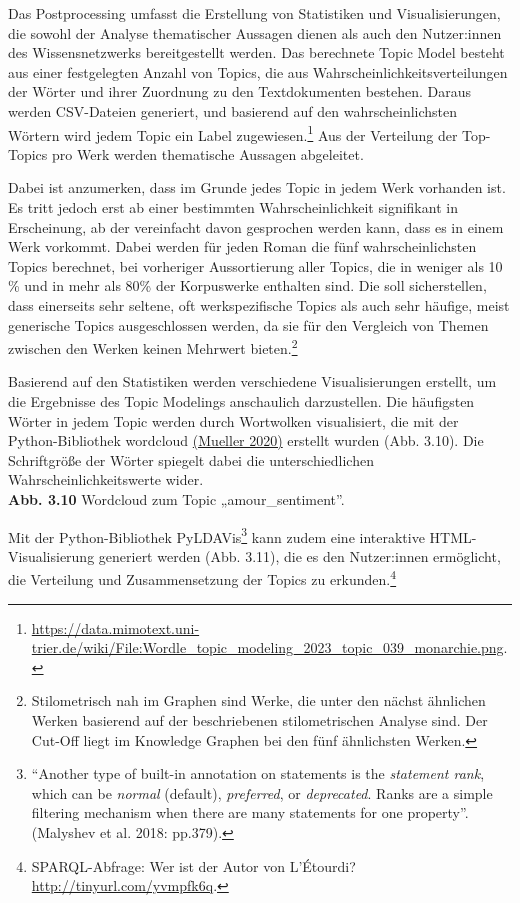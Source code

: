 \documentclass[
  12pt,
  letterpaper,
  DIV=11,
  numbers=noendperiod]{scrreprt}
\begin{document}
Das Postprocessing umfasst die Erstellung von Statistiken und
Visualisierungen, die sowohl der Analyse thematischer Aussagen dienen
als auch den Nutzer:innen des Wissensnetzwerks bereitgestellt werden.
Das berechnete Topic Model besteht aus einer festgelegten Anzahl von
Topics, die aus Wahrscheinlichkeitsverteilungen der Wörter und ihrer
Zuordnung zu den Textdokumenten bestehen. Daraus werden CSV-Dateien
generiert, und basierend auf den wahrscheinlichsten Wörtern wird jedem
Topic ein Label zugewiesen.\footnote{\url{https://data.mimotext.uni-trier.de/wiki/File:Wordle_topic_modeling_2023_topic_039_monarchie.png}.}
Aus der Verteilung der Top-Topics pro Werk werden thematische Aussagen
abgeleitet.

Dabei ist anzumerken, dass im Grunde jedes Topic in jedem Werk vorhanden
ist. Es tritt jedoch erst ab einer bestimmten Wahrscheinlichkeit
signifikant in Erscheinung, ab der vereinfacht davon gesprochen werden
kann, dass es in einem Werk vorkommt. Dabei werden für jeden Roman die
fünf wahrscheinlichsten Topics berechnet, bei vorheriger Aussortierung
aller Topics, die in weniger als 10 \% und in mehr als 80\% der
Korpuswerke enthalten sind. Die soll sicherstellen, dass einerseits sehr
seltene, oft werkspezifische Topics als auch sehr häufige, meist
generische Topics ausgeschlossen werden, da sie für den Vergleich von
Themen zwischen den Werken keinen Mehrwert bieten.\footnote{Stilometrisch
  nah im Graphen sind Werke, die unter den nächst ähnlichen Werken
  basierend auf der beschriebenen stilometrischen Analyse sind. Der
  Cut-Off liegt im Knowledge Graphen bei den fünf ähnlichsten Werken.}

Basierend auf den Statistiken werden verschiedene Visualisierungen
erstellt, um die Ergebnisse des Topic Modelings anschaulich
darzustellen. Die häufigsten Wörter in jedem Topic werden durch
Wortwolken visualisiert, die mit der Python-Bibliothek wordcloud
\href{https://www.zotero.org/google-docs/?9YPqZJ}{(Mueller 2020)}
erstellt wurden (Abb. 3.10). Die Schriftgröße der Wörter spiegelt dabei
die unterschiedlichen Wahrscheinlichkeitswerte wider.\\
\textbf{Abb. 3.10} Wordcloud zum Topic „amour\_sentiment''.

Mit der Python-Bibliothek PyLDAVis\footnote{``Another type of built-in
  annotation on statements is the \emph{statement rank}, which can be
  \emph{normal} (default), \emph{preferred}, or \emph{deprecated}. Ranks
  are a simple filtering mechanism when there are many statements for
  one property''. (Malyshev et al. 2018: pp.379).} kann zudem eine
interaktive HTML-Visualisierung generiert werden (Abb. 3.11), die es den
Nutzer:innen ermöglicht, die Verteilung und Zusammensetzung der Topics
zu erkunden.\footnote{SPARQL-Abfrage: Wer ist der Autor von L'Étourdi?
  \url{http://tinyurl.com/yvmpfk6q}.}
\end{document}
